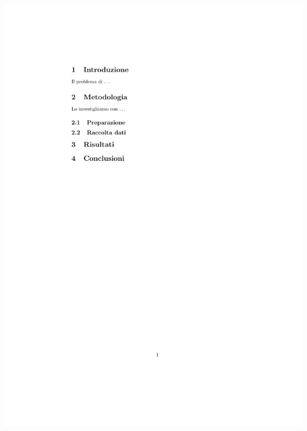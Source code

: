 \documentclass{beamer}
\begin{document}
\begin{frame}{\insertsubsection}
\begin{minipage}{0.35\linewidth}
\includegraphics[width=\textwidth,clip,trim=1.5in 6in 4in 1in]{structure-sections.pdf}
\end{minipage}
\end{frame}

\end{document}
